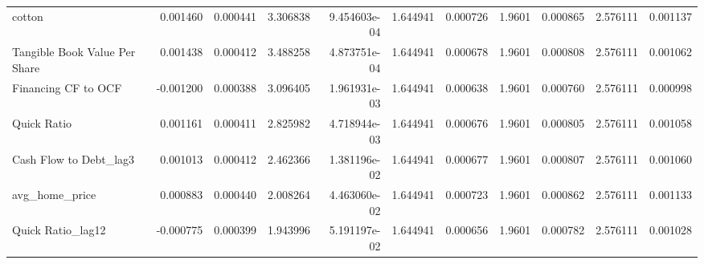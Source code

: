 \documentclass[12pt,a4paper,english]{article}
\begin{document}
{{\begin{tabular}{@{}lrrrrrrrrrr@{}}
			cotton                         & 0.001460                 & 0.000441                    & 3.306838                  & 9.454603e-04                             & 1.644941                      & 0.000726                      & 1.9601                       & 0.000865                     & 2.576111                     & 0.001137                     \\
			Tangible Book Value Per Share  & 0.001438                 & 0.000412                    & 3.488258                  & 4.873751e-04                             & 1.644941                      & 0.000678                      & 1.9601                       & 0.000808                     & 2.576111                     & 0.001062                     \\
			Financing CF to OCF            & -0.001200                & 0.000388                    & 3.096405                  & 1.961931e-03                             & 1.644941                      & 0.000638                      & 1.9601                       & 0.000760                     & 2.576111                     & 0.000998                     \\
			Quick Ratio                    & 0.001161                 & 0.000411                    & 2.825982                  & 4.718944e-03                             & 1.644941                      & 0.000676                      & 1.9601                       & 0.000805                     & 2.576111                     & 0.001058                     \\
			Cash Flow to Debt\_lag3        & 0.001013                 & 0.000412                    & 2.462366                  & 1.381196e-02                             & 1.644941                      & 0.000677                      & 1.9601                       & 0.000807                     & 2.576111                     & 0.001060                     \\
			avg\_home\_price               & 0.000883                 & 0.000440                    & 2.008264                  & 4.463060e-02                             & 1.644941                      & 0.000723                      & 1.9601                       & 0.000862                     & 2.576111                     & 0.001133                     \\
			Quick Ratio\_lag12             & -0.000775                & 0.000399                    & 1.943996                  & 5.191197e-02                             & 1.644941                      & 0.000656                      & 1.9601                       & 0.000782                     & 2.576111                     & 0.001028                     \\ \bottomrule
		\end{tabular}%
	}
}
\end{document}
